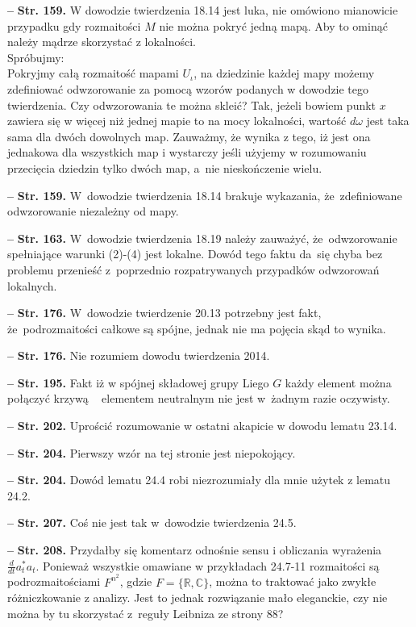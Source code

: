 \documentclass[a4paper,11pt]{article}
\newcommand{\tb}{\textbf}
\newcommand{\noi}{\noindent}
\newcommand{\start}{\noi \tb{--} {}}
\newcommand{\Str}[1]{\tb{Str. #1.}}
\begin{document}
\start \Str{159} W dowodzie twierdzenia 18.14 jest luka, nie omówiono mianowicie przypadku gdy rozmaitości $M$ nie można pokryć jedną mapą. Aby to ominąć należy mądrze skorzystać z lokalności. \\Spróbujmy:\\
Pokryjmy całą rozmaitość mapami $U_{ \iota }$, na dziedzinie każdej
mapy możemy zdefiniować odwzorowanie za pomocą wzorów podanych w
dowodzie tego twierdzenia. Czy odwzorowania te można skleić? Tak,
jeżeli bowiem punkt $x$ zawiera się w więcej niż jednej mapie to na
mocy lokalności, wartość $d \omega$ jest taka sama dla dwóch dowolnych
map. Zauważmy, że wynika z tego, iż jest ona jednakowa dla wszystkich
map i wystarczy jeśli użyjemy w rozumowaniu przecięcia dziedzin tylko
dwóch map, a~nie nieskończenie wielu.

\start \Str{159} W~dowodzie twierdzenia 18.14 brakuje wykazania,
że~zdefiniowane odwzorowanie niezależny od mapy.

\start \Str{163} W~dowodzie twierdzenia 18.19 należy zauważyć,
że~odwzorowanie spełniające warunki (2)-(4) jest lokalne. Dowód tego
faktu da~się chyba bez problemu przenieść z~poprzednio rozpatrywanych
przypadków odwzorowań lokalnych.

\start \Str{176} W~dowodzie twierdzenie 20.13 potrzebny jest fakt,
że~podrozmaitości całkowe są spójne, jednak nie ma pojęcia skąd to
wynika.

\start \Str{176} Nie rozumiem dowodu twierdzenia 2014.

\start \Str{195} Fakt iż w spójnej składowej grupy Liego $ G $ każdy
element można połączyć krzywą ~ elementem neutralnym nie jest w~żadnym
razie oczywisty.

\start \Str{202} Uprościć rozumowanie w ostatni akapicie w dowodu
lematu 23.14.

\start \Str{204} Pierwszy wzór na tej stronie jest niepokojący.

\start \Str{204} Dowód lematu 24.4 robi niezrozumiały dla mnie użytek
z lematu 24.2.

\start \Str{207} Coś nie jest tak w~dowodzie twierdzenia 24.5.

\start \Str{208} Przydałby się komentarz odnośnie sensu i obliczania
wyrażenia $\frac{ d }{ dt } a^{ * }_{ t } a_{ t }$. Ponieważ wszystkie
omawiane w przykładach 24.7-11 rozmaitości są podrozmaitościami
$F^{ n^{ 2 } }$, gdzie $F = \{ \mathbb{ R }, \mathbb{ C } \}$, można
to traktować jako zwykłe różniczkowanie z analizy. Jest to jednak
rozwiązanie mało eleganckie, czy nie można by tu skorzystać z~reguły
Leibniza ze strony 88?
\end{document}
